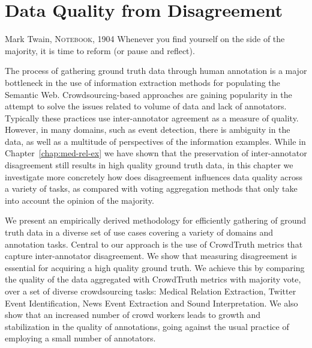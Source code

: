 \chapter{Data Quality from Disagreement}
\label{chap:maj-vote}

\begin{chapquote}{Mark Twain, \textsc{Notebook, 1904}}
Whenever you find yourself on the side of the majority, it is time to reform (or pause and reflect).
\end{chapquote}


The process of gathering ground truth data through human annotation is a major bottleneck in the use of information extraction methods for populating the Semantic Web. Crowdsourcing-based approaches are gaining popularity in the attempt to solve the issues related to volume of data and lack of annotators. Typically these practices use inter-annotator agreement as a measure of quality. However, in many domains, such as event detection, there is ambiguity in the data, as well as a multitude of perspectives of the information examples. While in Chapter~\ref{chap:med-rel-ex} we have shown that the preservation of inter-annotator disagreement still results in high quality ground truth data, in this chapter we investigate more concretely how does disagreement influences data quality across a variety of tasks, as compared with voting aggregation methods that only take into account the opinion of the majority.

We present an empirically derived methodology for efficiently gathering of ground truth data in a diverse set of use cases covering a variety of domains and annotation tasks. Central to our approach is the use of CrowdTruth metrics that capture inter-annotator disagreement. We show that measuring disagreement is essential for acquiring a high quality ground truth. We achieve this by comparing the quality of the data aggregated with CrowdTruth metrics with majority vote, over a set of diverse crowdsourcing tasks: Medical Relation Extraction, Twitter Event Identification, News Event Extraction and Sound Interpretation. We also show that an increased number of crowd workers leads to growth and stabilization in the quality of annotations, going against the usual practice of employing a small number of annotators.

